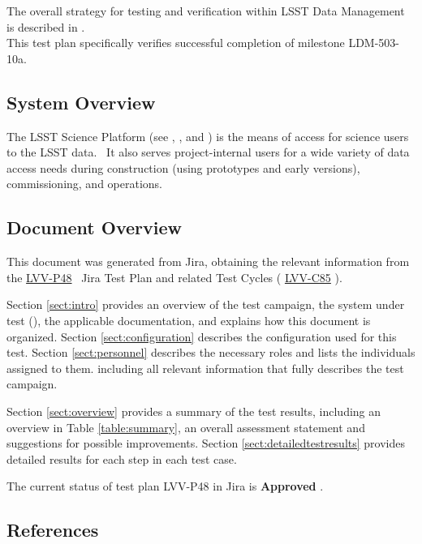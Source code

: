 \documentclass[DM,lsstdraft,STR,toc]{lsstdoc}
\begin{document}
The overall strategy for testing and verification within LSST Data
Management is described in .\\
This test plan specifically verifies successful completion of milestone
LDM-503-10a.



\subsection{System Overview}
\label{sect:systemoverview}

The LSST Science Platform (see , , and ) is the
means of access for science users to the LSST data. ~It also serves
project-internal users for a wide variety of data access needs during
construction (using prototypes and early versions), commissioning, and
operations.


\subsection{Document Overview}
\label{sect:docoverview}

This document was generated from Jira, obtaining the relevant information from the 
\href{https://jira.lsstcorp.org/secure/Tests.jspa#/testPlan/LVV-P48}{LVV-P48}
~Jira Test Plan and related Test Cycles (
  \href{https://jira.lsstcorp.org/secure/Tests.jspa#/testCycle/LVV-C85}{LVV-C85}
).

Section \ref{sect:intro} provides an overview of the test campaign, the system under test (\product{}),
the applicable documentation, and explains how this document is organized.
Section \ref{sect:configuration}  describes the configuration used for this test.
Section \ref{sect:personnel} describes the necessary roles and lists the individuals assigned to them.
including all relevant information that fully describes the test campaign.

Section \ref{sect:overview} provides a summary of the test results, including an overview in Table \ref{table:summary},
an overall assessment statement and suggestions for possible improvements.
Section \ref{sect:detailedtestresults} provides detailed results for each step in each test case.

The current status of test plan LVV-P48 in Jira is \textbf{ Approved }.

\subsection{References}
\label{sect:references}
\renewcommand{\refname}{}

\end{document}
